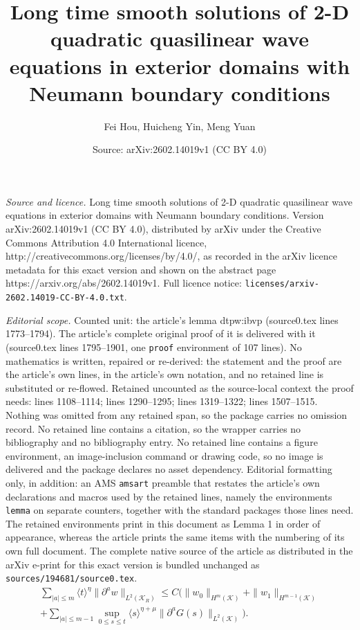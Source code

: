 \documentclass[10pt,a4paper]{amsart}
\title{Long time smooth solutions of 2-D quadratic quasilinear wave equations in exterior domains with Neumann boundary conditions}
\author{Fei Hou, Huicheng Yin, Meng Yuan}
\date{Source: arXiv:2602.14019v1 (CC BY 4.0)}
\def\cK{\mathcal K}
\def\p{\partial}
\newcommand{\w}[1]{\langle {#1} \rangle}
\begin{document}
\maketitle

\noindent\emph{Source and licence.} Long time smooth solutions of 2-D quadratic quasilinear wave equations in exterior domains with Neumann boundary conditions. Version arXiv:2602.14019v1 (CC BY 4.0), distributed by arXiv under the Creative Commons Attribution 4.0 International licence, http://creativecommons.org/licenses/by/4.0/, as recorded in the arXiv licence metadata for this exact version and shown on the abstract page https://arxiv.org/abs/2602.14019v1. Full licence notice: \texttt{licenses/arxiv-2602.14019-CC-BY-4.0.txt}.\par\smallskip

\noindent\textit{Editorial scope.} Counted unit: the article's lemma dtpw:ibvp (source0.tex lines 1773--1794). The article's complete original proof of it is delivered with it (source0.tex lines 1795--1901, one \texttt{proof} environment of 107 lines). No mathematics is written, repaired or re-derived: the statement and the proof are the article's own lines, in the article's own notation, and no retained line is substituted or re-flowed.  Retained uncounted as the source-local context the proof needs: lines 1108--1114; lines 1290--1295; lines 1319--1322; lines 1507--1515.  Nothing was omitted from any retained span, so the package carries no omission record.  No retained line contains a citation, so the wrapper carries no bibliography and no bibliography entry.  No retained line contains a figure environment, an image-inclusion command or drawing code, so no image is delivered and the package declares no asset dependency.  Editorial formatting only, in addition: an AMS \texttt{amsart} preamble that restates the article's own declarations and macros used by the retained lines, namely the environments \texttt{lemma} on separate counters, together with the standard packages those lines need.  The retained environments print in this document as Lemma 1 in order of appearance, whereas the article prints the same items with the numbering of its own full document.  The complete native source of the article as distributed in the arXiv e-print for this exact version is bundled unchanged as \texttt{sources/194681/source0.tex}.
\begin{equation}\label{loc:decay+}
\begin{split}
\sum_{|a|\le m}\w{t}^{\eta}\|\p^aw\|_{L^2(\cK_R)}
\le C(\|w_0\|_{H^{m}(\cK)}+\|w_1\|_{H^{m-1}(\cK)}\\
+\sum_{|a|\le m-1}\sup_{0\le s\le t}\w{s}^{\eta+\mu}\|\p^aG(s)\|_{L^2(\cK)}).
\end{split}
\end{equation}
\end{document}
